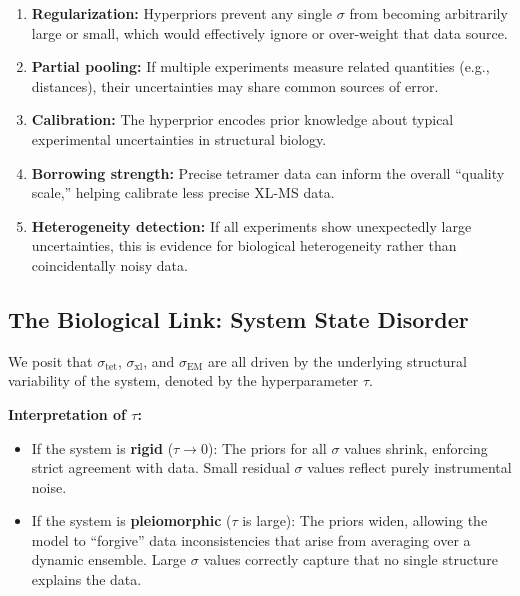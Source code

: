 \documentclass[11pt,a4paper]{article}
\theoremstyle{definition}
\begin{document}
\begin{enumerate}
    \item \textbf{Regularization:} Hyperpriors prevent any single $\sigma$ from becoming arbitrarily large or small, which would effectively ignore or over-weight that data source.
    
    \item \textbf{Partial pooling:} If multiple experiments measure related quantities (e.g., distances), their uncertainties may share common sources of error.
    
    \item \textbf{Calibration:} The hyperprior encodes prior knowledge about typical experimental uncertainties in structural biology.
    
    \item \textbf{Borrowing strength:} Precise tetramer data can inform the overall ``quality scale,'' helping calibrate less precise XL-MS data.
    
    \item \textbf{Heterogeneity detection:} If all experiments show unexpectedly large uncertainties, this is evidence for biological heterogeneity rather than coincidentally noisy data.
\end{enumerate}

\subsection{The Biological Link: System State Disorder}

We posit that $\sigma_{\text{tet}}$, $\sigma_{\text{xl}}$, and $\sigma_{\text{EM}}$ are all driven by the underlying structural variability of the system, denoted by the hyperparameter $\tau$.

\begin{center}
\end{center}

\textbf{Interpretation of $\tau$:}
\begin{itemize}
    \item If the system is \textbf{rigid} ($\tau \to 0$): The priors for all $\sigma$ values shrink, enforcing strict agreement with data. Small residual $\sigma$ values reflect purely instrumental noise.
    
    \item If the system is \textbf{pleiomorphic} ($\tau$ is large): The priors widen, allowing the model to ``forgive'' data inconsistencies that arise from averaging over a dynamic ensemble. Large $\sigma$ values correctly capture that no single structure explains the data.
\end{itemize}
\end{document}
